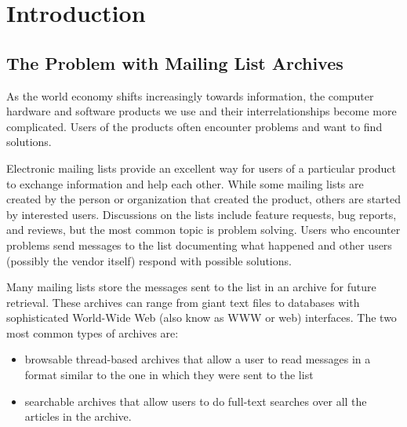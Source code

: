 
\chapter{Introduction}

\section{The Problem with Mailing List Archives}
As the world economy shifts increasingly towards information, the computer
hardware and software products we use and their interrelationships become more
complicated. Users of the products often encounter problems and want to find
solutions.

Electronic mailing lists provide an excellent way for users of a particular
product to exchange information and help each other. While some mailing lists
are created by the person or organization that created the product, others are
started by interested users. Discussions on the lists include feature requests,
bug reports, and reviews, but the most common topic is problem solving. Users
who encounter problems send messages to the list documenting what happened and
other users (possibly the vendor itself) respond with possible solutions.

Many mailing lists store the messages sent to the list in an archive for future
retrieval. These archives can range from giant text files to databases with
sophisticated World-Wide Web (also know as WWW or web) interfaces. The two most
common types of archives are:
\begin{itemize}
\item browsable thread-based archives that allow a user to read messages in a
  format similar to the one in which they were sent to the list
\item searchable archives that allow users to do full-text searches over all
  the articles in the archive.
\end{itemize}

